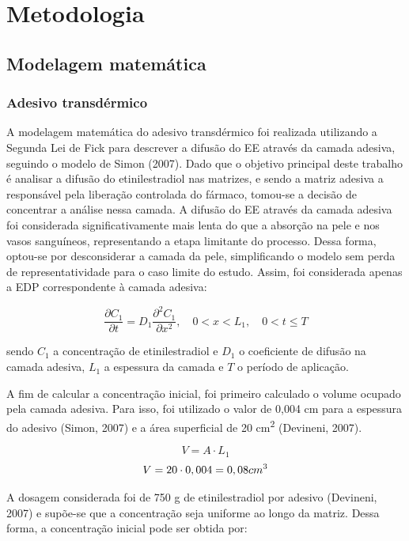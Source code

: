 \chapter{Metodologia}\label{chp:metodologia}
\section{Modelagem matemática}
\subsection{Adesivo transdérmico}

A modelagem matemática do adesivo transdérmico foi realizada utilizando a Segunda Lei de Fick para descrever a difusão do EE através da camada adesiva, seguindo o modelo de Simon (2007). Dado que o objetivo principal deste trabalho é analisar a difusão do etinilestradiol nas matrizes, e sendo a matriz adesiva a responsável pela liberação controlada do fármaco, tomou-se a decisão de concentrar a análise nessa camada. A difusão do EE através da camada adesiva foi considerada significativamente mais lenta do que a absorção na pele e nos vasos sanguíneos, representando a etapa limitante do processo. Dessa forma, optou-se por desconsiderar a camada da pele, simplificando o modelo sem perda de representatividade para o caso limite do estudo. Assim, foi considerada apenas a EDP correspondente à camada adesiva:

\begin{equation}
\frac{\partial C_1}{\partial t} = D_1 \frac{\partial^2 C_1}{\partial x^2}, \quad 0 < x < L_1, \quad 0 < t \leq T
\end{equation}

\noindent sendo $C_1$ a concentração de etinilestradiol e $D_1$ o coeficiente de difusão na camada adesiva, $L_1$ a espessura da camada e $T$ o período de aplicação.

A fim de calcular a concentração inicial, foi primeiro calculado o volume ocupado pela camada adesiva. Para isso, foi utilizado o valor de 0,004 cm para a espessura do adesivo (Simon, 2007) e a área superficial de 20 cm\textsuperscript{2} (Devineni, 2007).

\begin{equation}
    V = A \cdot L_1 
\end{equation}
\begin{equation}
    V = 20 \cdot 0,004 = 0,08 cm\textsuperscript{3}
\end{equation}

A dosagem considerada foi de 750 \textmu g de etinilestradiol por adesivo (Devineni, 2007) e supõe-se que a concentração seja uniforme ao longo da matriz. Dessa forma, a concentração inicial pode ser obtida por: 

